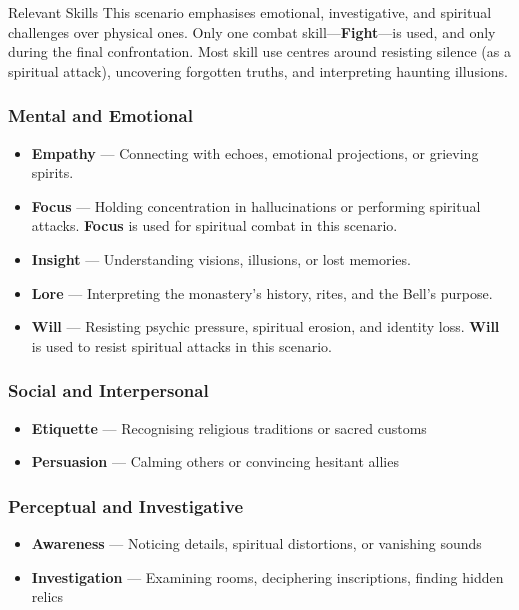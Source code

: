 \documentclass[nodeprecatedcode,bg=print]{dndbook/dndbook}
\begin{document}
\begin{WyrdSidebar}{Relevant Skills}
    This scenario emphasises emotional, investigative, and spiritual challenges over physical ones. Only one combat skill—\textbf{Fight}—is used, and only during the final confrontation. Most skill use centres around resisting silence (as a spiritual attack), uncovering forgotten truths, and interpreting haunting illusions.
    
    \vspace{0.5\baselineskip}
    
    \subsubsection*{Mental and Emotional}
    \begin{itemize}
        \item \textbf{Empathy} — Connecting with echoes, emotional projections, or grieving spirits.
        \item \textbf{Focus} — Holding concentration in hallucinations or performing spiritual attacks. \textbf{Focus} is used for spiritual combat in this scenario.
        \item \textbf{Insight} — Understanding visions, illusions, or lost memories.
        \item \textbf{Lore} — Interpreting the monastery’s history, rites, and the Bell’s purpose.
        \item \textbf{Will} — Resisting psychic pressure, spiritual erosion, and identity loss. \textbf{Will} is used to resist spiritual attacks in this scenario.
    \end{itemize}
    
    \subsubsection*{Social and Interpersonal}
    \begin{itemize}
        \item \textbf{Etiquette} — Recognising religious traditions or sacred customs
        \item \textbf{Persuasion} — Calming others or convincing hesitant allies
    \end{itemize}
    
    \subsubsection*{Perceptual and Investigative}
    \begin{itemize}
        \item \textbf{Awareness} — Noticing details, spiritual distortions, or vanishing sounds
        \item \textbf{Investigation} — Examining rooms, deciphering inscriptions, finding hidden relics
    \end{itemize}
    

\end{WyrdSidebar}
\end{document}
